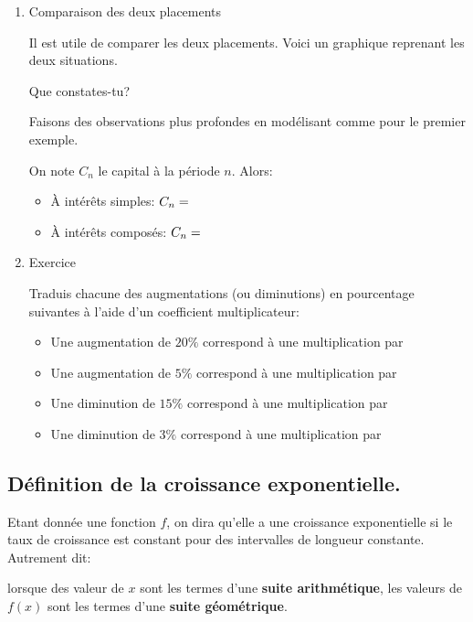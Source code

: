 \documentclass[a4paper,12pt,singlepage]{report}
\begin{document}
\begin{enumerate}
\item Comparaison des deux placements
\label{sec:orgab8a7b4}

Il est utile de comparer les deux placements. Voici un graphique reprenant les
deux situations.

\begin{center}

\end{center}

Que constates-tu? \dotfill

\dotfill

\dotfill


Faisons des observations plus profondes en modélisant comme pour le premier
exemple.

On note \(C_n\) le capital à la période \(n\). Alors:
\begin{itemize}
\item À intérêts simples: \(C_n=\dotfill\)
\item À intérêts composés: \(C_n=\dotfill\)
\end{itemize}

\item Exercice
\label{sec:org21c9c99}

Traduis chacune des augmentations (ou diminutions) en pourcentage suivantes à
l'aide d'un coefficient multiplicateur:

\begin{itemize}
\item Une augmentation de \(20\%\) correspond à une multiplication par\dotfill
\item Une augmentation de \(5\%\) correspond à une multiplication par\dotfill
\item Une diminution de \(15\%\) correspond à une multiplication par\dotfill
\item Une diminution de \(3\%\) correspond à une multiplication par\dotfill
\end{itemize}
\end{enumerate}


\subsection{Définition de la croissance exponentielle.}
\label{sec:orgf444d87}

\begin{definition}
Etant donnée une fonction \(f\), on dira qu'elle a une croissance exponentielle
si le taux de croissance est constant pour des intervalles de longueur
constante. Autrement dit:

lorsque des valeur de \(x\) sont les termes d'une \textbf{suite arithmétique}, les valeurs de
\(f(x)\) sont les termes d'une \textbf{suite géométrique}.
\end{definition}
\end{document}
